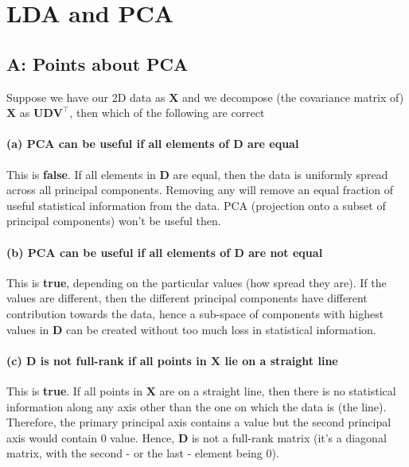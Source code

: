 
\section[Q2: LDA and PCA]{LDA and PCA}

\subsection{A: Points about PCA}

Suppose we have our 2D data as $\mathbf{X}$ and we decompose (the covariance matrix of) $\mathbf{X}$ as $\mathbf{UDV^\top}$, then which of the following are correct

\paragraph{(a) PCA can be useful if all elements of $\mathbf{D}$ are equal}
This is \textbf{false}. If all elements in $\mathbf{D}$ are equal, then the data is uniformly spread across all principal components. Removing any will remove an equal fraction of useful statistical information from the data. PCA (projection onto a subset of principal components) won't be useful then.

\paragraph{(b) PCA can be useful if all elements of $\mathbf{D}$ are not equal}
This is \textbf{true}, depending on the particular values (how spread they are). If the values are different, then the different principal components have different contribution towards the data, hence a sub-space of components with highest values in $\mathbf{D}$ can be created without too much loss in statistical information.

\paragraph{(c) $\mathbf{D}$ is not full-rank if all points in $\mathbf{X}$ lie on a straight line}
This is \textbf{true}. If all points in $\mathbf{X}$ are on a straight line, then there is no statistical information along any axis other than the one on which the data is (the line). Therefore, the primary principal axis contains a value but the second principal axis would contain 0 value. Hence, $\mathbf{D}$ is not a full-rank matrix (it's a diagonal matrix, with the second - or the last - element being 0).

